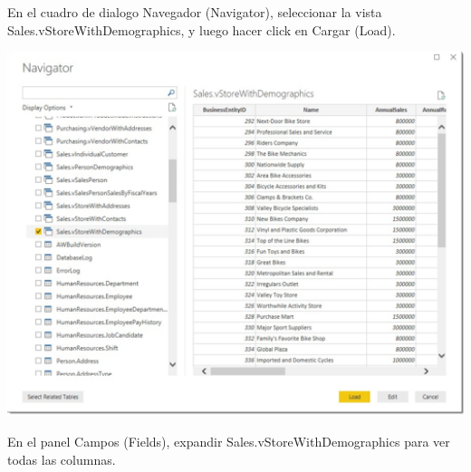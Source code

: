 \documentclass[12pt,letterpaper]{article}
\begin{document}
En el cuadro de dialogo Navegador (Navigator), seleccionar la vista Sales.vStoreWithDemographics, y luego
hacer click en Cargar (Load).
\begin{center}
    \includegraphics[width=16cm]{img/10.png}  
\end{center}
En el panel Campos (Fields), expandir Sales.vStoreWithDemographics para ver todas las columnas.
\end{document}
